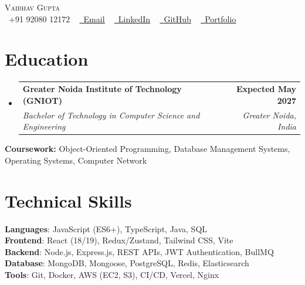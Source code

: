\documentclass[letterpaper,10pt]{article}
\makeatletter
\newcommand{\resumeSubheading}[4]{
  \vspace{-2pt}\item
    \begin{tabular*}{1.0\textwidth}[t]{l@{\extracolsep{\fill}}r}
      \textbf{#1} & \textbf{\small #2} \\
      \textit{\small#3} & \textit{\small #4} \\
    \end{tabular*}\vspace{-7pt}
}
\newcommand{\resumeSubHeadingListStart}{\begin{itemize}[leftmargin=0.0in, label={}]}
\newcommand{\resumeSubHeadingListEnd}{\end{itemize}}
\makeatother
\begin{document}

\begin{center}
    {\Huge \scshape Vaibhav Gupta} \\ \vspace{1pt}
    \small \raisebox{-0.1\height}\faPhone\ +91 92080 12172 ~
    \href{mailto:vaibhv19.business@gmail.com}{\raisebox{-0.2\height}\faEnvelope\ \underline{Email}} ~
    \href{https://linkedin.com/in/vaibhv19}{\raisebox{-0.2\height}\faLinkedin\ \underline{LinkedIn}} ~
    \href{https://github.com/vaibhv19}{\raisebox{-0.2\height}\faGithub\ \underline{GitHub}} ~
    \href{https://vaibhv19.dev}{\raisebox{-0.2\height}\faGlobe\ \underline{Portfolio}}
    \vspace{-8pt}
\end{center}

\section{Education}
  \resumeSubHeadingListStart
    \resumeSubheading
      {Greater Noida Institute of Technology (GNIOT)}{Expected May 2027}
      {Bachelor of Technology in Computer Science and Engineering}{Greater Noida, India}
  \resumeSubHeadingListEnd
  \vspace{-4pt}
  \begin{itemize}[leftmargin=0in, label={}]
    \small{\item{\textbf{Coursework:} Object-Oriented Programming, Database Management Systems, Operating Systems, Computer Network}}
    \vspace{-10pt}
\end{itemize}

\section{Technical Skills}
 \begin{itemize}[leftmargin=0in, label={}]
    \small{\item{
     \textbf{Languages}{: JavaScript (ES6+), TypeScript, Java, SQL} \\
     \textbf{Frontend}{: React (18/19), Redux/Zustand, Tailwind CSS, Vite} \\
     \textbf{Backend}{: Node.js, Express.js, REST APIs, JWT Authentication, BullMQ} \\
     \textbf{Database}{: MongoDB, Mongoose, PostgreSQL, Redis, Elasticsearch} \\
     \textbf{Tools}{: Git, Docker, AWS (EC2, S3), CI/CD, Vercel, Nginx} \\
    }}
 \end{itemize}
 \vspace{-12pt}
\end{document}
